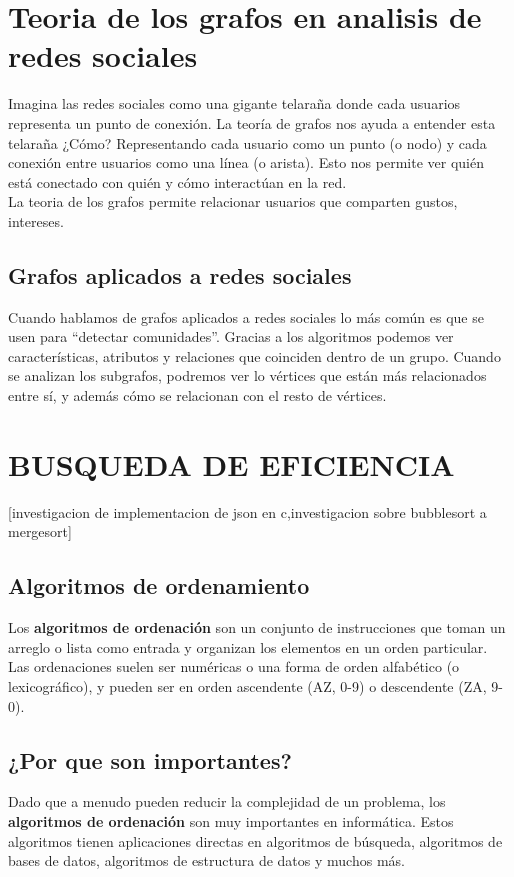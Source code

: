 \section{{\textbf{Teoria de los grafos en analisis de redes sociales}}}
Imagina las redes sociales como una gigante telaraña donde cada usuarios representa un punto de conexión. 
La teoría de grafos nos ayuda a entender esta telaraña ¿Cómo? Representando cada usuario como un punto (o nodo) y cada conexión entre usuarios como una línea (o arista). 
Esto nos permite ver quién está conectado con quién y cómo interactúan en la red.\\
La teoria de los grafos permite relacionar usuarios que comparten gustos, intereses.
\subsection*{Grafos aplicados a redes sociales}
Cuando hablamos de grafos aplicados a redes sociales lo más común es que se usen para “detectar comunidades”. 
Gracias a los algoritmos podemos ver características, atributos y relaciones que coinciden dentro de un grupo. 
Cuando se analizan los subgrafos, 
podremos ver lo vértices que están más relacionados entre sí, y además cómo se relacionan con el resto de vértices.

\section{BUSQUEDA DE EFICIENCIA}
[investigacion de implementacion de json en c,investigacion sobre bubblesort a mergesort]
\subsection*{Algoritmos de ordenamiento}
Los \textbf{algoritmos de ordenación} son un conjunto de instrucciones que toman un arreglo o lista como entrada y organizan los elementos en un orden particular.
Las ordenaciones suelen ser numéricas o una forma de orden alfabético (o lexicográfico), y pueden ser en orden ascendente (AZ, 0-9) o descendente (ZA, 9-0).

\subsection*{¿Por que son importantes?}
Dado que a menudo pueden reducir la complejidad de un problema, los \textbf{algoritmos de ordenación} son muy importantes en informática. 
Estos algoritmos tienen aplicaciones directas en algoritmos de búsqueda, algoritmos de bases de datos, algoritmos de estructura de datos y muchos más.

